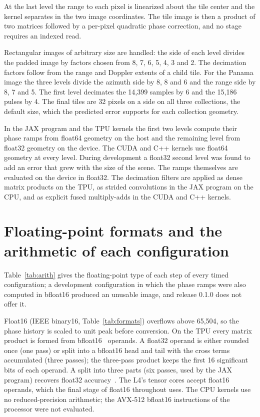 \documentclass[11pt]{article}
\begin{document}
At the last level the range to each pixel is linearized about the tile center and the kernel separates in the two image coordinates. The tile image is then a product of two matrices followed by a per-pixel quadratic phase correction, and no stage requires an indexed read. 

Rectangular images of arbitrary size are handled: the side of each level divides the padded image by factors chosen from 8, 7, 6, 5, 4, 3 and 2. The decimation factors follow from the range and Doppler extents of a child tile. For the Panama image the three levels divide the azimuth side by 8, 8 and 6 and the range side by 8, 7 and 5. The first level decimates the 14,399 samples by 6 and the 15,186 pulses by 4. The final tiles are 32 pixels on a side on all three collections, the default size, which the predicted error supports for each collection geometry.

In the JAX program and the TPU kernels the first two levels compute their phase ramps from float64 geometry on the host and the remaining level from float32 geometry on the device. The CUDA and C++ kernels use float64 geometry at every level. During development a float32 second level was found to add an error that grew with the size of the scene. The ramps themselves are evaluated on the device in float32. The decimation filters are applied as dense matrix products on the TPU, as strided convolutions in the JAX program on the CPU, and as explicit fused multiply-adds in the CUDA and C++ kernels.

\section{Floating-point formats and the arithmetic of each configuration}
\label{app:formats}

Table~\ref{tab:arith} gives the floating-point type of each step of every timed configuration; a development configuration in which the phase ramps were also computed in bfloat16 produced an unusable image, and release 0.1.0 does not offer it.


Float16 (IEEE binary16, Table~\ref{tab:formats}) overflows above 65,504, so the phase history is scaled to unit peak before conversion. On the TPU every matrix product is formed from bfloat16~\cite{wang2019bfloat16} operands. A float32 operand is either rounded once (one pass) or split into a bfloat16 head and tail with the cross terms accumulated (three passes); the three-pass product keeps the first 16 significant bits of each operand. A split into three parts (six passes, used by the JAX program) recovers float32 accuracy~\cite{jax2018}. The L4's tensor cores accept float16 operands, which the final stage of float16 throughout uses. The CPU kernels use no reduced-precision arithmetic; the AVX-512 bfloat16 instructions of the processor were not evaluated.
\end{document}
